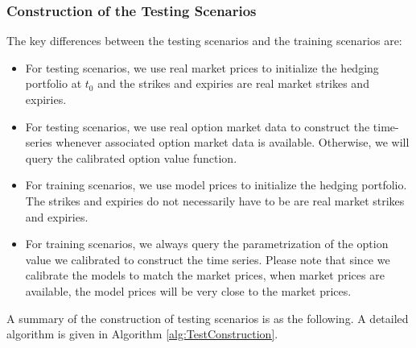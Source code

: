 \documentclass[letterpaper,12pt,titlepage,oneside,final]{book}
\numberwithin{equation}{section}
\theoremstyle{definition}
\begin{document}
\subsubsection{Construction of the Testing Scenarios}
\label{sec:AugTest}
The key differences between the testing scenarios and the training scenarios are:
\begin{itemize}
	\item  For testing scenarios, we use real market prices to initialize the hedging portfolio at $t_0$ and the strikes and expiries are real market strikes and expiries.
	\item  For testing scenarios, we use real option market data to construct the time-series whenever associated  option market data is available. Otherwise, we will query the calibrated option value function.
	\item For training scenarios, we use model prices to initialize the hedging portfolio. The strikes and expiries do not necessarily have to be are real market strikes and expiries.
	\item   For training scenarios, we always query the parametrization of the option value we calibrated to construct  the time series. Please note that  since we calibrate the models to match the market prices, when market prices are available, the model prices will be very close to the market prices. 
\end{itemize}
A summary of the construction of testing scenarios is as the following. A detailed algorithm is given in Algorithm \ref{alg:TestConstruction}.
\end{document}
